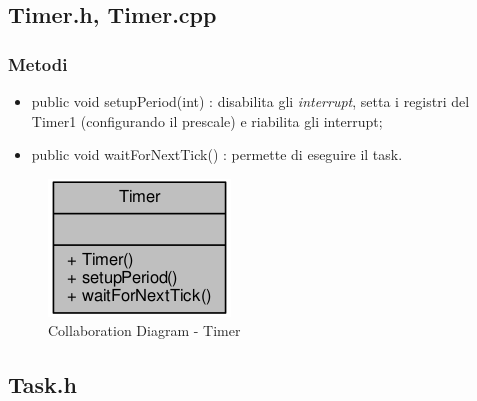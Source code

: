 \subsection{Timer.h, Timer.cpp}
\subsubsection{Metodi}
\begin{itemize}
	\item public void setupPeriod(int) : disabilita gli \textit{interrupt}, setta i registri del Timer1 (configurando il prescale) e riabilita gli interrupt;
	\item public void waitForNextTick() : permette di eseguire il task.
\end{itemize}
\begin{figure}[!ht]
	\centering
	\includegraphics[scale=.5]{img/UML/CollaborationDiagram/Timer.png}
	\caption{Collaboration Diagram - Timer}
\end{figure}

\newpage
\subsection{Task.h}
